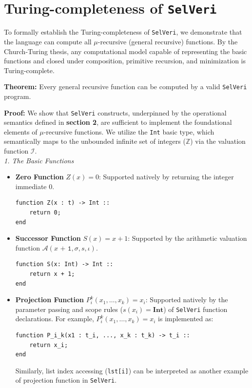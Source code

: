 \documentclass{article}
\begin{document}
\newpage
\section{Turing-completeness of \texttt{SelVeri}}

To formally establish the Turing-completeness of \texttt{SelVeri}, we demonstrate that the language can compute all $\mu$-recursive (general recursive) functions. By the Church-Turing thesis, any computational model capable of representing the basic functions and closed under composition, primitive recursion, and minimization is Turing-complete. 

\textbf{Theorem:} Every general recursive function can be computed by a valid \texttt{SelVeri} program.

\textbf{Proof:} We show that \texttt{SelVeri} constructs, underpinned by the operational semantics defined in \textbf{section 2}, are sufficient to implement the foundational elements of $\mu$-recursive functions. We utilize the \texttt{Int} basic type, which semantically maps to the unbounded infinite set of integers ($\mathbb{Z}$) via the valuation function $\mathcal{I}$. \\

\textit{1. The Basic Functions}
\begin{itemize}
    \item \textbf{Zero Function} $Z(x) = 0$: Supported natively by returning the integer immediate $0$.
    \begin{verbatim}
function Z(x : t) -> Int ::
    return 0;
end
    \end{verbatim}
    
    \item \textbf{Successor Function} $S(x) = x + 1$: Supported by the arithmetic valuation function $\mathcal{A}(\texttt{$x$ + 1}, \sigma, s, \iota)$.
    \begin{verbatim}
function S(x: Int) -> Int ::
    return x + 1;
end
    \end{verbatim}
    
    \item \textbf{Projection Function} $P_i^k(x_1, \dots, x_k) = x_i$: Supported natively by the parameter passing and scope rules ($s(x_i) = \textbf{Int}$) of \texttt{SelVeri} function declarations. For example, $P_i^k(x_1, \dots, x_k) = x_i$ is implemented as:
    \begin{verbatim}
function P_i_k(x1 : t_i, ..., x_k : t_k) -> t_i ::
    return x_i;
end
    \end{verbatim}

    Similarly, list index accessing (\texttt{lst[i]}) can be interpreted as another example of projection function in \texttt{SelVeri}.
\end{itemize}
\end{document}
